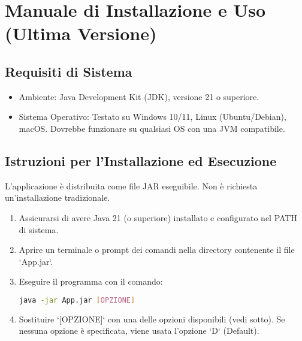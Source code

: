 \documentclass[a4paper,12pt]{article}
\begin{document}
    \newpage


    \section{Manuale di Installazione e Uso (Ultima Versione)}

    \subsection{Requisiti di Sistema}
    \begin{itemize}
        \item Ambiente: Java Development Kit (JDK), versione 21 o superiore.
        \item Sistema Operativo: Testato su Windows 10/11, Linux (Ubuntu/Debian), macOS. Dovrebbe funzionare su qualsiasi OS con una JVM compatibile.
    \end{itemize}

    \subsection{Istruzioni per l'Installazione ed Esecuzione}
    L'applicazione è distribuita come file JAR eseguibile. Non è richiesta un'installazione tradizionale.
    \begin{enumerate}
        \item Assicurarsi di avere Java 21 (o superiore) installato e configurato nel PATH di sistema.
        \item Aprire un terminale o prompt dei comandi nella directory contenente il file `App.jar`.
        \item Eseguire il programma con il comando:
        \begin{lstlisting}[language=bash, numbers=none, frame=single, rulecolor=\color{lightgray}]
java -jar App.jar [OPZIONE]
        \end{lstlisting}
        \item Sostituire `[OPZIONE]` con una delle opzioni disponibili (vedi sotto). Se nessuna opzione è specificata, viene usata l'opzione `D` (Default).
    \end{enumerate}
\end{document}
